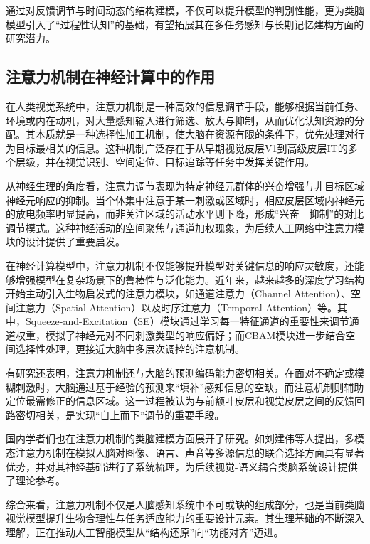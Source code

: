 通过对反馈调节与时间动态的结构建模，不仅可以提升模型的判别性能，更为类脑模型引入了“过程性认知”的基础，有望拓展其在多任务感知与长期记忆建构方面的研究潜力。


\subsection{注意力机制在神经计算中的作用}

在人类视觉系统中，注意力机制是一种高效的信息调节手段，能够根据当前任务、环境或内在动机，对大量感知输入进行筛选、放大与抑制，从而优化认知资源的分配。其本质就是一种选择性加工机制，使大脑在资源有限的条件下，优先处理对行为目标最相关的信息。这种机制广泛存在于从早期视觉皮层V1到高级皮层IT的多个层级，并在视觉识别、空间定位、目标追踪等任务中发挥关键作用。

从神经生理的角度看，注意力调节表现为特定神经元群体的兴奋增强与非目标区域神经元响应的抑制。当个体集中注意于某一刺激或区域时，相应皮层区域内神经元的放电频率明显提高，而非关注区域的活动水平则下降，形成“兴奋—抑制”的对比调节模式。这种神经活动的空间聚焦与通道加权现象，为后续人工网络中注意力模块的设计提供了重要启发\cite{carrasco2011visual}。

在神经计算模型中，注意力机制不仅能够提升模型对关键信息的响应灵敏度，还能够增强模型在复杂场景下的鲁棒性与泛化能力。近年来，越来越多的深度学习结构开始主动引入生物启发式的注意力模块，如通道注意力（Channel Attention）、空间注意力（Spatial Attention）以及时序注意力（Temporal Attention）等。其中，Squeeze-and-Excitation（SE）模块通过学习每一特征通道的重要性来调节通道权重，模拟了神经元对不同刺激类型的响应偏好\cite{hu2018squeeze}；而CBAM模块进一步结合空间选择性处理，更接近大脑中多层次调控的注意机制\cite{woo2018cbam}。

有研究还表明，注意力机制还与大脑的预测编码能力密切相关。在面对不确定或模糊刺激时，大脑通过基于经验的预测来“填补”感知信息的空缺，而注意机制则辅助定位最需修正的信息区域。这一过程被认为与前额叶皮层和视觉皮层之间的反馈回路密切相关，是实现“自上而下”调节的重要手段\cite{bastos2012canonical}。

国内学者们也在注意力机制的类脑建模方面展开了研究。如刘建伟等人提出，多模态注意力机制在模拟人脑对图像、语言、声音等多源信息的联合选择方面具有显著优势，并对其神经基础进行了系统梳理，为后续视觉-语义耦合类脑系统设计提供了理论参考\cite{刘建伟2020多模态深度学习综述}。

综合来看，注意力机制不仅是人脑感知系统中不可或缺的组成部分，也是当前类脑视觉模型提升生物合理性与任务适应能力的重要设计元素。其生理基础的不断深入理解，正在推动人工智能模型从“结构还原”向“功能对齐”迈进。


